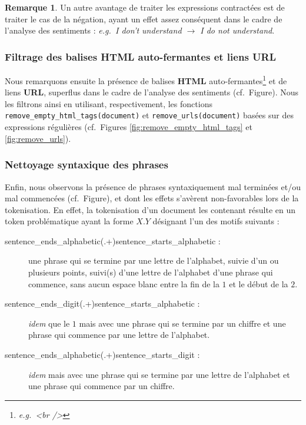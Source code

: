 \documentclass[12pt,a4paper]{report}
\theoremstyle{definition}
\newtheorem*{remark}{Remarque}
\begin{document}
\begin{remark}
  Un autre avantage de traiter les expressions contractées est de traiter le cas de la négation, ayant un effet assez conséquent dans le cadre de l'analyse des sentiments : \emph{e.g.~I don't understand $\rightarrow$ I do not understand}.
\end{remark}

\subsubsection{Filtrage des balises HTML auto-fermantes et liens URL}
Nous remarquons ensuite la présence de balises \textbf{HTML} auto-fermantes\footnote{\emph{e.g.~<br />}} et de liens \textbf{URL}, superflus dans le cadre de l'analyse des sentiments (cf.~Figure). Nous les filtrons ainsi en utilisant, respectivement, les fonctions \texttt{remove\_empty\_html\_tags(document)} et \texttt{remove\_urls(document)} basées sur des expressions régulières (cf.~Figures \ref{fig:remove_empty_html_tags} et \ref{fig:remove_urls}).

\subsubsection{Nettoyage syntaxique des phrases}
Enfin, nous observons la présence de phrases syntaxiquement mal terminées et/ou mal commencées (cf.~Figure), et dont les effets s'avèrent non-favorables lors de la tokenisation. En effet, la tokenisation d'un document les contenant résulte en un token problématique ayant la forme $X.Y$ désignant l'un des motifs suivants :
\begin{description}
  \item[sentence\_ends\_alphabetic(.+)sentence\_starts\_alphabetic :] une phrase qui se termine par une lettre de l'alphabet, suivie d'un ou plusieurs points, suivi(s) d'une lettre de l'alphabet d'une phrase qui commence, sans aucun espace blanc entre la fin de la $1$\iere{} et le début de la $2$\ieme{}.
  \item[sentence\_ends\_digit(.+)sentence\_starts\_alphabetic :] \emph{idem} que le $1$\ier{} mais avec une phrase qui se termine par un chiffre et une phrase qui commence par une lettre de l'alphabet.
  \item[sentence\_ends\_alphabetic(.+)sentence\_starts\_digit :] \emph{idem} mais avec une phrase qui se termine par une lettre de l'alphabet et une phrase qui commence par un chiffre.
\end{description}
\end{document}
